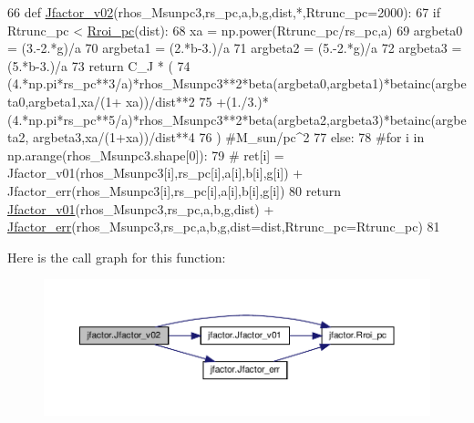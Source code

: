 \begin{DoxyCode}
66 \textcolor{keyword}{def }\hyperlink{namespacejfactor_aaa43ebb0d9314fc697123b204465286e}{Jfactor\_v02}(rhos\_Msunpc3,rs\_pc,a,b,g,dist,*,Rtrunc\_pc=2000):
67     \textcolor{keywordflow}{if} Rtrunc\_pc < \hyperlink{namespacejfactor_ae5aad7f2ac90b82740c027677d7f4ac7}{Rroi\_pc}(dist):
68         xa = np.power(Rtrunc\_pc/rs\_pc,a)
69         argbeta0 = (3.-2.*g)/a
70         argbeta1 = (2.*b-3.)/a
71         argbeta2 = (5.-2.*g)/a
72         argbeta3 = (5.*b-3.)/a
73         \textcolor{keywordflow}{return} C\_J * (
74             (4.*np.pi*rs\_pc**3/a)*rhos\_Msunpc3**2*beta(argbeta0,argbeta1)*betainc(argbeta0,argbeta1,xa/(1+
      xa))/dist**2
75             +(1./3.)*(4.*np.pi*rs\_pc**5/a)*rhos\_Msunpc3**2*beta(argbeta2,argbeta3)*betainc(argbeta2,
      argbeta3,xa/(1+xa))/dist**4
76             ) \textcolor{comment}{#M\_sun/pc^2}
77     \textcolor{keywordflow}{else}:
78         \textcolor{comment}{#for i in np.arange(rhos\_Msunpc3.shape[0]):}
79         \textcolor{comment}{#    ret[i] = Jfactor\_v01(rhos\_Msunpc3[i],rs\_pc[i],a[i],b[i],g[i]) +
       Jfactor\_err(rhos\_Msunpc3[i],rs\_pc[i],a[i],b[i],g[i])}
80         \textcolor{keywordflow}{return} \hyperlink{namespacejfactor_aeb50ca469052983461a3e8382cfb4f95}{Jfactor\_v01}(rhos\_Msunpc3,rs\_pc,a,b,g,dist) + 
      \hyperlink{namespacejfactor_ad8b8ed7dec1d2c3b4432d37e53117f03}{Jfactor\_err}(rhos\_Msunpc3,rs\_pc,a,b,g,dist=dist,Rtrunc\_pc=Rtrunc\_pc)
81         
\end{DoxyCode}
Here is the call graph for this function\+:\nopagebreak
\begin{figure}[H]
\begin{center}
\leavevmode
\includegraphics[width=350pt]{de/d47/namespacejfactor_aaa43ebb0d9314fc697123b204465286e_cgraph}
\end{center}
\end{figure}
\mbox{\label{namespacejfactor_aa60ca47daf4f993e2cc8bd268f7b206d}} 
